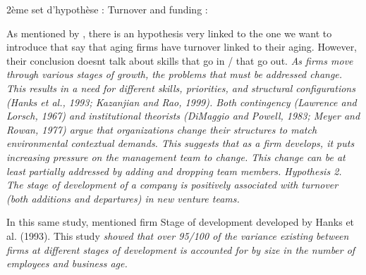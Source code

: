 \begin{itemize}
\begin{itemize}
2ème set d'hypothèse : Turnover and funding :\newline

As mentioned by \citet{chandler2005antecedents}, there is an hypothesis very linked to the one we want to introduce that say that aging firms have turnover linked to their aging. However, their conclusion doesnt talk about skills that go in / that go out. \textit{As firms move through various stages of growth, the problems that must be addressed change. This results in a need for different skills, priorities, and structural configurations (Hanks et al., 1993; Kazanjian and Rao, 1999). Both contingency (Lawrence and Lorsch, 1967) and institutional theorists (DiMaggio and Powell, 1983; Meyer and Rowan, 1977) argue that organizations change their structures to match environmental contextual demands. This suggests that as a firm develops, it puts increasing pressure on the management team to change. This change can be at least partially addressed by adding and dropping team members. Hypothesis 2. The stage of development of a company is positively associated with turnover (both additions and departures) in new venture teams.}

In this same study, \citet{chandler2005antecedents} mentioned firm Stage of development developed by Hanks et al. (1993). This study \textit{showed that over 95/100 of the variance existing between firms at different stages of development is accounted for by size in the number of employees and business age.}


\end{itemize}
\end{itemize}
